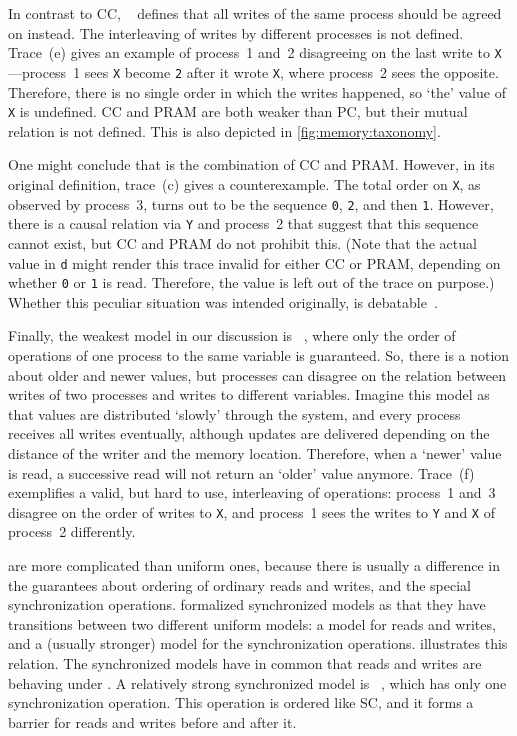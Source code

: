 In contrast to \ac{CC}, ~\cite{lipton:pram} defines that all writes of the same process should be agreed on instead.
The interleaving of writes by different processes is not defined.
Trace~(e) gives an example of process~1 and~2 disagreeing on the last write to \lstinline|X|---process~1 sees \lstinline|X| become \lstinline|2| after it wrote \lstinline|X|, where process~2 sees the opposite.
Therefore, there is no single order in which the writes happened, so `the' value of \lstinline|X| is undefined.
\Ac{CC} and \ac{PRAM} are both weaker than \ac{PC}, but their mutual relation is not defined.
This is also depicted in \vref{fig:memory:taxonomy}.

One might conclude that  is the combination of \ac{CC} and \ac{PRAM}.
However, in its original definition, trace~(c) gives a counterexample.
The total order on \lstinline|X|, as observed by process~3, turns out to be the sequence \lstinline|0|, \lstinline|2|, and then \lstinline|1|.
However, there is a causal relation via \lstinline|Y| and process~2 that suggest that this sequence cannot exist, but \ac{CC} and \ac{PRAM} do not prohibit this.
(Note that the actual value in \lstinline|d| might render this trace invalid for either \ac{CC} or \ac{PRAM}, depending on whether \lstinline|0| or \lstinline|1| is read.
Therefore, the value is left out of the trace on purpose.)
Whether this peculiar situation was intended originally, is debatable~\cite{steinke:unified}.

Finally, the weakest model in our discussion is \SlowC*~\cite{hutto:slow_memory}, where only the order of operations of one process to the same variable is guaranteed.
So, there is a notion about older and newer values, but processes can disagree on the relation between writes of two processes and writes to different variables.
Imagine this model as that values are distributed `slowly' through the system, and every process receives all writes eventually, although updates are delivered depending on the distance of the writer and the memory location.
Therefore, when a `newer' value is read, a successive read will not return an `older' value anymore.
Trace~(f) exemplifies a valid, but hard to use, interleaving of operations: process~1 and~3 disagree on the order of writes to \lstinline|X|, and process~1 sees the writes to \lstinline|Y| and \lstinline|X| of process~2 differently.

 are more complicated than uniform ones, because there is usually a difference in the guarantees about ordering of ordinary reads and writes, and the special synchronization operations.
 formalized synchronized models as that they have transitions between two different uniform models: a model for reads and writes, and a (usually stronger) model for the synchronization operations.
 illustrates this relation.
The synchronized models have in common that reads and writes are behaving under \SlowC.
A relatively strong synchronized model is ~\cite{dubois:buffering}, which has only one synchronization operation.
This operation is ordered like \ac{SC}, and it forms a barrier for reads and writes before and after it.

